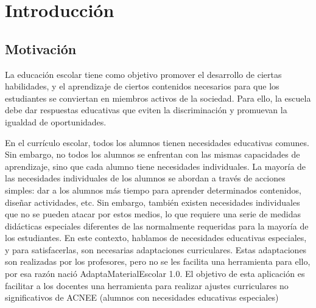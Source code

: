 \chapter{Introducción}
\label{cap:introduccion}


\section{Motivación}
La educación escolar tiene como objetivo promover el desarrollo de ciertas habilidades, y el aprendizaje de ciertos contenidos necesarios para que los estudiantes se conviertan en miembros activos de la sociedad. Para ello, la escuela debe dar respuestas educativas que eviten la discriminación y promuevan la igualdad de oportunidades.

En el currículo escolar, todos los alumnos tienen necesidades educativas comunes. Sin embargo, no todos los alumnos se enfrentan con las mismas capacidades de aprendizaje, sino que cada alumno tiene necesidades individuales. La mayoría de las necesidades individuales de los alumnos se abordan a través de acciones simples: dar a los alumnos más tiempo para aprender determinados contenidos, diseñar actividades, etc.  Sin embargo, también existen necesidades individuales que no se pueden atacar por estos medios, lo que requiere una serie de medidas didácticas especiales diferentes de las normalmente requeridas para la mayoría de los estudiantes. En este contexto, hablamos de necesidades educativas especiales, y para satisfacerlas, son necesarias adaptaciones curriculares.  Estas adaptaciones son realizadas por los profesores, pero no se les facilita una herramienta para ello, por esa razón nació AdaptaMaterialEscolar 1.0. El objetivo de esta aplicación es facilitar a los docentes una herramienta para realizar ajustes curriculares no significativos de ACNEE (alumnos con necesidades educativas especiales)






